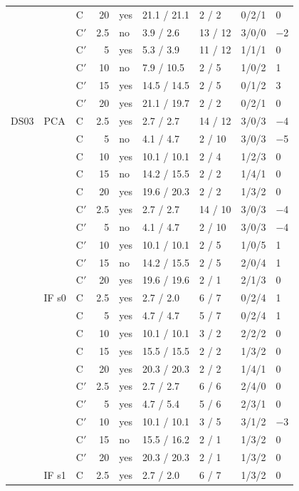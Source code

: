 \begin{scriptsize}
\begin{longtable}{lllrlllll}
 &  & C & 20 & yes & 21.1 / 21.1 & 2 / 2 & 0/2/1 & 0 \\
 &  & C$'$ & 2.5 & no & 3.9 / 2.6 & 13 / 12 & 3/0/0 & $-$2 \\
 &  & C$'$ & 5 & yes & 5.3 / 3.9 & 11 / 12 & 1/1/1 & 0 \\
 &  & C$'$ & 10 & no & 7.9 / 10.5 & 2 / 5 & 1/0/2 & 1 \\
 &  & C$'$ & 15 & yes & 14.5 / 14.5 & 2 / 5 & 0/1/2 & 3 \\
 &  & C$'$ & 20 & yes & 21.1 / 19.7 & 2 / 2 & 0/2/1 & 0 \\
\midrule
DS03 & PCA & C & 2.5 & yes & 2.7 / 2.7 & 14 / 12 & 3/0/3 & $-$4 \\
 &  & C & 5 & no & 4.1 / 4.7 & 2 / 10 & 3/0/3 & $-$5 \\
 &  & C & 10 & yes & 10.1 / 10.1 & 2 / 4 & 1/2/3 & 0 \\
 &  & C & 15 & no & 14.2 / 15.5 & 2 / 2 & 1/4/1 & 0 \\
 &  & C & 20 & yes & 19.6 / 20.3 & 2 / 2 & 1/3/2 & 0 \\
 &  & C$'$ & 2.5 & yes & 2.7 / 2.7 & 14 / 10 & 3/0/3 & $-$4 \\
 &  & C$'$ & 5 & no & 4.1 / 4.7 & 2 / 10 & 3/0/3 & $-$4 \\
 &  & C$'$ & 10 & yes & 10.1 / 10.1 & 2 / 5 & 1/0/5 & 1 \\
 &  & C$'$ & 15 & no & 14.2 / 15.5 & 2 / 5 & 2/0/4 & 1 \\
 &  & C$'$ & 20 & yes & 19.6 / 19.6 & 2 / 1 & 2/1/3 & 0 \\
 & IF s0 & C & 2.5 & yes & 2.7 / 2.0 & 6 / 7 & 0/2/4 & 1 \\
 &  & C & 5 & yes & 4.7 / 4.7 & 5 / 7 & 0/2/4 & 1 \\
 &  & C & 10 & yes & 10.1 / 10.1 & 3 / 2 & 2/2/2 & 0 \\
 &  & C & 15 & yes & 15.5 / 15.5 & 2 / 2 & 1/3/2 & 0 \\
 &  & C & 20 & yes & 20.3 / 20.3 & 2 / 2 & 1/4/1 & 0 \\
 &  & C$'$ & 2.5 & yes & 2.7 / 2.7 & 6 / 6 & 2/4/0 & 0 \\
 &  & C$'$ & 5 & yes & 4.7 / 5.4 & 5 / 6 & 2/3/1 & 0 \\
 &  & C$'$ & 10 & yes & 10.1 / 10.1 & 3 / 5 & 3/1/2 & $-$3 \\
 &  & C$'$ & 15 & no & 15.5 / 16.2 & 2 / 1 & 1/3/2 & 0 \\
 &  & C$'$ & 20 & yes & 20.3 / 20.3 & 2 / 1 & 1/3/2 & 0 \\
 & IF s1 & C & 2.5 & yes & 2.7 / 2.0 & 6 / 7 & 1/3/2 & 0 \\

\end{longtable}
\end{scriptsize}
